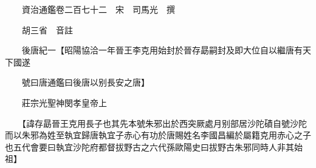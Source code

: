 










 


 
 


 

  
  
  
  
  





  
  
  
  
  
 
  

  

  
  
  



  

 
 

  
   




  

  
  


  　　資治通鑑卷二百七十二　宋　司馬光　撰

　　胡三省　音註

　　後唐紀一【昭陽協洽一年晉王李克用始封於晉存勗嗣封及即大位自以繼唐有天下國遂

　　號曰唐通鑑曰後唐以别長安之唐】

　　莊宗光聖神閔孝皇帝上

　　【諱存勗晉王克用長子也其先本號朱邪出於西突厥處月别部居沙陀磧自號沙陀而以朱邪為姓至執宜歸唐執宜子赤心有功於唐賜姓名李國昌編於屬籍克用赤心之子也五代會要曰執宜沙陀府都督拔野古之六代孫歐陽史曰拔野古朱邪同時人非其始祖】

